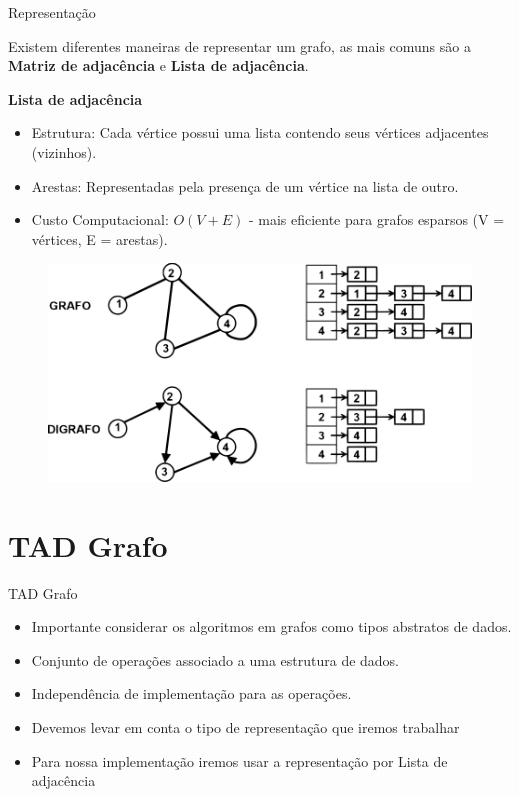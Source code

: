 \documentclass{if-beamer}
\begin{document}
\begin{frame}{Representação} 
	
	\justifying
	Existem diferentes maneiras de representar um grafo, as mais comuns são a \textbf{Matriz de adjacência} e \textbf{Lista de adjacência}.\pause
	
	\textbf{Lista de adjacência}
	

	\begin{itemize}
		\item  Estrutura: Cada vértice possui uma lista contendo seus vértices adjacentes (vizinhos).
		\item  Arestas: Representadas pela presença de um vértice na lista de outro.
		\item  Custo Computacional: $O(V+E)$ - mais eficiente para grafos esparsos (V = vértices, E = arestas).
	\end{itemize} 
	
	\begin{figure}
		\centering
		\includegraphics[scale=0.70]{Figuras/exemplos-grafo/r.png}
	\end{figure}
\end{frame}


\section{TAD Grafo}

\begin{frame}{TAD Grafo} 
	
	\justifying	
	
	\begin{itemize}
		\item Importante considerar os algoritmos em grafos como tipos abstratos de dados. 
		\item Conjunto de operações associado a uma estrutura de dados.
		\item Independência de implementação para as operações. 
		\item Devemos levar em conta o tipo de representação que iremos trabalhar
		\item Para nossa implementação iremos usar a representação por Lista de adjacência
		
	\end{itemize} 
\end{frame}
\end{document}
